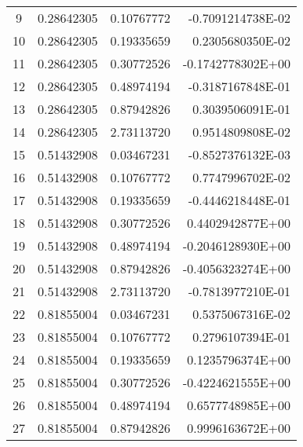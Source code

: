 \begin{longtable}{@{\extracolsep{\fill}}cllr@{}}
9  &  0.28642305  &  0.10767772  &  -0.7091214738E-02 \\

10  &  0.28642305  &  0.19335659  &   0.2305680350E-02 \\

11  &  0.28642305  &  0.30772526  &  -0.1742778302E+00 \\

12  &  0.28642305  &  0.48974194  &  -0.3187167848E-01 \\

13  &  0.28642305  &  0.87942826  &   0.3039506091E-01 \\

14  &  0.28642305  &  2.73113720  &   0.9514809808E-02 \\

15  &  0.51432908  &  0.03467231  &  -0.8527376132E-03 \\

16  &  0.51432908  &  0.10767772  &   0.7747996702E-02 \\

17  &  0.51432908  &  0.19335659  &  -0.4446218448E-01 \\

18  &  0.51432908  &  0.30772526  &   0.4402942877E+00 \\

19  &  0.51432908  &  0.48974194  &  -0.2046128930E+00 \\

20  &  0.51432908  &  0.87942826  &  -0.4056323274E+00 \\

21  &  0.51432908  &  2.73113720  &  -0.7813977210E-01 \\

22  &  0.81855004  &  0.03467231  &   0.5375067316E-02 \\

23  &  0.81855004  &  0.10767772  &   0.2796107394E-01 \\

24  &  0.81855004  &  0.19335659  &   0.1235796374E+00 \\

25  &  0.81855004  &  0.30772526  &  -0.4224621555E+00 \\

26  &  0.81855004  &  0.48974194  &   0.6577748985E+00 \\

27  &  0.81855004  &  0.87942826  &   0.9996163672E+00 \\


\end{longtable}
